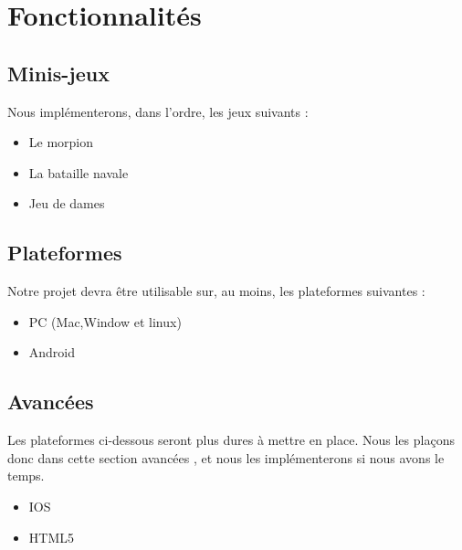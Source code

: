\documentclass{report}
\begin{document}
\chapter{Fonctionnalités}
\section{Minis-jeux}
Nous implémenterons, dans l’ordre, les jeux suivants :
\begin{itemize}
	\item Le morpion
    \item La bataille navale
    \item Jeu de dames
\end{itemize}
\section{Plateformes}
Notre projet devra être utilisable sur, au moins, les plateformes suivantes :
\begin{itemize}
	\item PC (Mac,Window et linux)
    \item Android
\end{itemize}
\section{Avancées}
Les plateformes ci-dessous seront plus dures à mettre en place. Nous les plaçons donc dans cette section \og avancées \fg{}, et nous les implémenterons si nous avons le temps.
\begin{itemize}
    \item IOS
    \item HTML5
\end{itemize}
\end{document}
